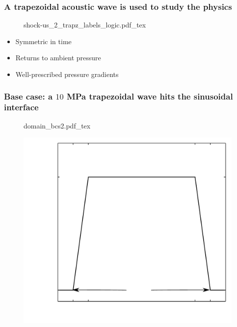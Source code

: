 \begin{frame}
  \frametitle{A trapezoidal acoustic wave is used to study the physics}
  \begin{figure}%
    \centering%
    \def\svgwidth{\textwidth}%
    {\footnotesize
    {shock-us_2_trapz_labels_logic.pdf_tex}%
    }
  \end{figure}
  \begin{itemize}
  \item Symmetric in time
  \item Returns to ambient pressure
  \item Well-prescribed pressure gradients
  \end{itemize}
\end{frame}
%
\begin{frame}\frametitle{\vspace*{0.5cm} Base case: a $10$ MPa trapezoidal wave hits the sinusoidal interface}%
  \hfill%
  \begin{minipage}{0.48\textwidth}
    \begin{figure}
      \centering
      \hfill%
      \def\svgwidth{0.75\textwidth} {\footnotesize
        {domain_bcs2.pdf_tex}%
      }%
      \hfill%
    \end{figure}
  \end{minipage}
  \hfill%
  \begin{minipage}{0.48\textwidth}
    \begin{figure}
      \centering%
      \hfill%
      \includegraphics[width=\textwidth]{../figs/lung_figs/p0_vs_y}%
      \hfill%
    \end{figure}
  \end{minipage}
  \hfill%
\end{frame}




